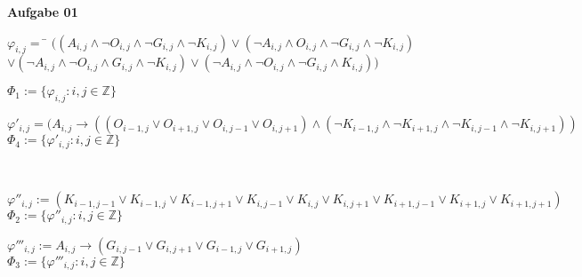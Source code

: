 \documentclass[a4paper,10pt]{article}
\begin{document}
	\parindent0pt
	\textbf{Aufgabe 01} \\
	\begin{compactenum} [(a)]
		\item
		\begin{compactitem}
			\item
			\begin{tabbing}
				$ \varphi_{i,j} = $ 
				\= $ ((A_{i,j}\wedge \lnot O_{i,j} \wedge \lnot G_{i,j}\wedge \lnot K_{i,j})\vee(\lnot A_{i,j}\wedge O_{i,j}\wedge\lnot G_{i,j}\wedge \lnot K_{i,j}) $ \\
				\> $ \vee ( \lnot A_{i,j}\wedge \lnot O_{i,j}\wedge G_{i,j}\wedge \lnot K_{i,j})\vee( \lnot A_{i,j}\wedge \lnot O_{i,j}\wedge \lnot G_{i,j}\wedge K_{i,j}))$
			\end{tabbing}
			$ \varPhi_1 := \{\varphi_{i,j} : i,j \in \mathbb{Z}\} $
			
			\item $ \varphi'_{i,j} = (A_{i,j} \rightarrow ((O_{i-1,j} \vee O_{i+1,j} \vee O_{i,j-1} \vee O_{i,j+1}) \wedge (\lnot K_{i-1,j} \wedge \lnot K_{i+1,j} \wedge \lnot K_{i,j-1} \wedge \lnot K_{i,j+1})) $ \\
			$ \varPhi_4 := \{\varphi'_{i,j} : i,j \in \mathbb{Z}\} $
		\end{compactitem}\
		\item $ \varphi''_{i,j} := (K_{i-1,j-1}\vee K_{i-1,j}\vee K_{i-1,j+1}\vee K_{i,j-1}\vee K_{i,j}\vee K_{i,j+1}\vee K_{i+1,j-1}\vee K_{i+1,j}\vee K_{i+1,j+1}) $ \\
		$ \varPhi_2 := \{\varphi''_{i,j} : i,j \in \mathbb{Z}\} $\\
		\item $ \varphi'''_{i,j} := A_{i,j}\rightarrow(G_{i,j-1}\vee G_{i,j+1}\vee G_{i-1,j}\vee G_{i+1,j}) $ \\
		$ \varPhi_3 := \{\varphi'''_{i,j} : i,j \in \mathbb{Z} \} $
		\item 
	\end{compactenum} \
	
\end{document}
